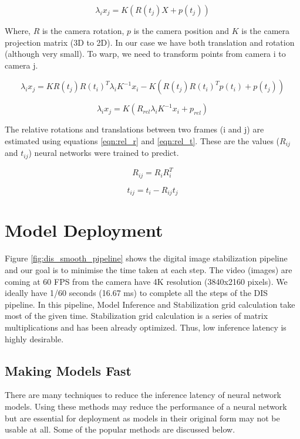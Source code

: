 \begin{equation}
    \lambda_{i} x_{j} = K(R(t_j)X + p(t_j))
\label{eqn:x_tj}
\end{equation}

Where, $ R $ is the camera rotation, $ p $ is the camera position and $ K $ is the camera projection matrix (3D to 2D). In our case we have both translation and rotation (although very small). To warp, we need to transform points from camera i to camera j.

\begin{equation}
    \lambda_{i} x_{j} = KR(t_j)R(t_i)^{T} \lambda_{i} K^{-1} x_{i} - K(R(t_j)R(t_i)^{T} p(t_i) + p(t_j))
\label{eqn:homography}
\end{equation}

\begin{equation}
    \lambda_{i} x_{j} = K(R_{rel} \lambda_{i} K^{-1} x_i + p_{rel})
\label{eqn:homography_simplified}
\end{equation}

The relative rotations and translations between two frames (i and j) are estimated using equations \ref{eqn:rel_r} and \ref{eqn:rel_t}. These are the values ($ R_{ij} $ and $ t_{ij} $) neural networks were trained to predict. 

\begin{equation}
R_{ij} = R_i R_i^T
\label{eqn:rel_r}    
\end{equation}

\begin{equation}
t_{ij} = t_i - R_{ij}t_j
\label{eqn:rel_t}
\end{equation}

\section{Model Deployment}
Figure \ref{fig:dis_smooth_pipeline} shows the digital image stabilization pipeline and our goal is to minimise the time taken at each step. The video (images) are coming at 60 FPS from the camera have 4K resolution (3840x2160 pixels). We ideally have 1/60 seconds (16.67 ms) to complete all the steps of the DIS pipeline. In this pipeline, Model Inference and Stabilization grid calculation take most of the given time. Stabilization grid calculation is a series of matrix multiplications and has been already optimized. Thus, low inference latency is highly desirable.

\subsection{Making Models Fast}
There are many techniques to reduce the inference latency of neural network models. Using these methods may reduce the performance of a neural network but are essential for deployment as models in their original form may not be usable at all. Some of the popular methods are discussed below.


